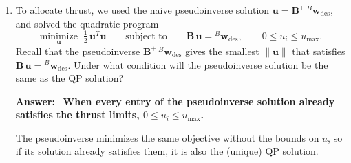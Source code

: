 \documentclass[11pt,letterpaper]{article}
\newenvironment{answer}{\par\vspace{4pt}\color{blue!60!black}\textbf{Answer:}\ }{\par\vspace{4pt}}
\begin{document}
\begin{enumerate}[label=\textbf{\arabic*.}, leftmargin=*, itemsep=4pt]
\begin{answer}
Here ${}^{B}\dot{\mathbf{r}} = \mathbf{A}(\mathbf{a})^T\,{}^{N}\dot{\mathbf{r}}$ is the velocity of the center of mass in body-frame components.
\begin{itemize}[leftmargin=1.5em, itemsep=1pt]
    \item $\mathbf{N}(\mathbf{q})$: the position $\mathbf{r}$ is still in $N$, so the velocity has to be rotated back, ${}^{N}\dot{\mathbf{r}} = \mathbf{A}(\mathbf{a})\,{}^{B}\dot{\mathbf{r}}$. The top-left block of $\mathbf{N}$ changes from $\mathbf{I}$ to $\mathbf{A}(\mathbf{a})$.
    \item $\mathbf{c}(\mathbf{q},\mathbf{v})$: the body frame rotates, so differentiating the velocity in $B$ adds the term $m\,{}^{B}\boldsymbol{\omega}\times{}^{B}\dot{\mathbf{r}}$ to the translational rows, which were zero before.
    \item $\mathbf{g}(\mathbf{q})$: gravity points toward the Earth's center, which is fixed in $N$, so in body components it has to be rotated by $\mathbf{A}(\mathbf{a})^T$. It now depends on the attitude as well as the position.
    \item $\mathbf{B}(\mathbf{q})$: the thrust force no longer has to be rotated into $N$, so $\mathbf{B}(\mathbf{q})$ becomes the constant body-frame input Jacobian $\mathbf{B}$.
    \item $\mathbf{M} = \operatorname{diag}(m\,\mathbf{I},\ \mathbf{J})$ is unchanged, and the rotational rows are unchanged, since Euler's equation was already written in $B$.
\end{itemize}
\end{answer}

\item To allocate thrust, we used the naive pseudoinverse solution $\mathbf{u} = \mathbf{B}^{+}\,{}^{B}\mathbf{w}_{\text{des}}$, and solved the quadratic program
\[
\underset{\mathbf{u}}{\text{minimize}} \;\; \tfrac12\,\mathbf{u}^T\mathbf{u}
\qquad \text{subject to} \qquad
\mathbf{B}\,\mathbf{u} = {}^{B}\mathbf{w}_{\text{des}}, \qquad
0 \le u_i \le u_{\max}.
\]
Recall that the pseudoinverse $\mathbf{B}^{+}\,{}^{B}\mathbf{w}_{\text{des}}$ gives the smallest $\lVert\mathbf{u}\rVert$ that satisfies $\mathbf{B}\,\mathbf{u} = {}^{B}\mathbf{w}_{\text{des}}$. Under what condition will the pseudoinverse solution be the same as the QP solution?

\begin{answer}
\textbf{When every entry of the pseudoinverse solution already satisfies the thrust limits, $0 \le u_i \le u_{\max}$.}

The pseudoinverse minimizes the same objective without the bounds on $u$, so if its solution already satisfies them, it is also the (unique) QP solution.
\end{answer}

\end{enumerate}
\end{document}
